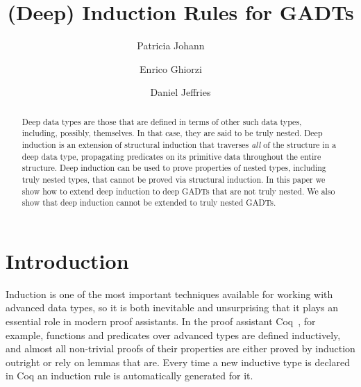 \documentclass[9pt]{entcs}
\begin{document}
\begin{frontmatter}
  \vspace*{-0.1in}
  \title{(Deep) Induction Rules for GADTs\vspace*{-0.1in}}
  \author{Patricia Johann~~~~}%
  \author{Enrico Ghiorzi~~~~}%
  \author{Daniel Jeffries}%
  \address{$\mathtt{\{johannp,ghiorzie,jeffriesd\}@appstate.edu}$\\
    Appalachian State University}

\vspace*{-0.1in}

\begin{abstract} 
  Deep data types are those that are defined in terms of other such
  data types, including, possibly, themselves.  In that case, they are
  said to be truly nested.  Deep induction is an extension of
  structural induction that traverses {\em all} of the structure in a
  deep data type, propagating predicates on its primitive data
  throughout the entire structure.  Deep induction can be used to prove
  properties of nested types, including truly nested types, that
  cannot be proved via structural induction.  In this paper we show
  how to extend deep induction to deep GADTs that are not truly
  nested. We also show that deep induction cannot be extended to truly
  nested GADTs.
\end{abstract}

\end{frontmatter}

\vspace*{-0.1in}

\section{Introduction}\label{sec:intro}

Induction is one of the most important techniques available for
working with advanced data types, so it is both inevitable and
unsurprising that it plays an essential role in modern proof
assistants. In the proof assistant Coq~\cite{coq20}, for example,
functions and predicates over advanced types are defined inductively,
and almost all non-trivial proofs of their properties are either
proved by induction outright or rely on lemmas that are.  Every time a
new inductive type is declared in Coq an induction rule is
automatically generated for it.
\end{document}
